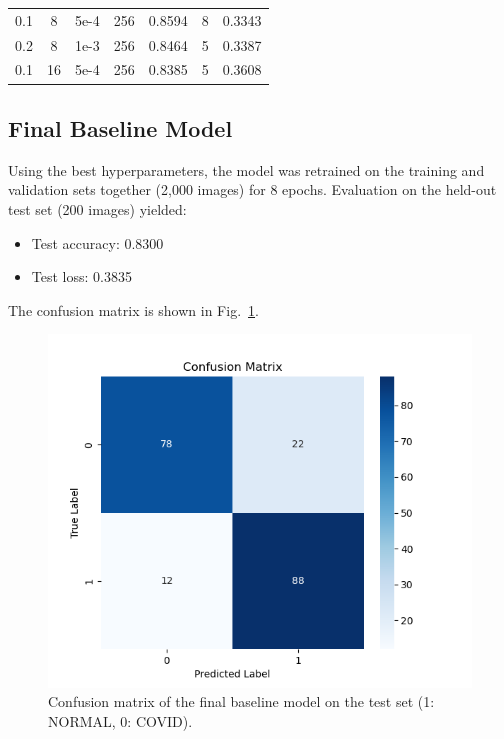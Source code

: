\documentclass[conference]{IEEEtran}
\begin{document}
\begin{table}[htbp]
\begin{adjustbox}{width=0.48\textwidth}
\begin{tabular}{|c|c|c|c|c|c|c|}
			0.1           & 8            & 5e-4            & 256           & 0.8594           & 8            & 0.3343           \\
			0.2           & 8            & 1e-3            & 256           & 0.8464           & 5            & 0.3387           \\
			0.1           & 16           & 5e-4            & 256           & 0.8385           & 5            & 0.3608           \\
			\hline
		\end{tabular}
	\end{adjustbox}
\end{table}


\subsection{Final Baseline Model}
Using the best hyperparameters, the model was retrained on the training and validation sets together (2,000 images) for 8 epochs. Evaluation on the held-out test set (200 images) yielded:
\begin{itemize}
	\item Test accuracy: 0.8300
	\item Test loss: 0.3835
\end{itemize}
\vspace{0.5cm}

The confusion matrix is shown in Fig.~\ref{fig:conf_matrix}.

\begin{figure}[htbp]
	\centerline{\includegraphics[width=\linewidth]{Images/confusion_matrix_baseline.png}}
	\caption{Confusion matrix of the final baseline model on the test set (1: NORMAL, 0: COVID).}
	\label{fig:conf_matrix}
\end{figure}
\end{document}
